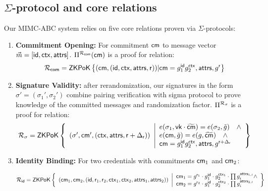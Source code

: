 \subsection{$\Sigma$-protocol and core relations}

Our MIMC-ABC system relies on five core relations proven via $\Sigma$-protocols:
\begin{enumerate}
    \item \textbf{Commitment Opening:} For commitment $\mathsf{cm}$ to message vector $\vec{m} = [\mathsf{id}, \mathsf{ctx}, \mathsf{attrs}]$. $\Pi^{\mathcal{R}_{\mathsf{com}}}(\mathsf{cm})$ is a proof for relation:
    \[
     {\mathcal{R}_{\mathsf{com}}} = {\mathsf{ZKPoK}} \left\{(\mathsf{cm}, (\mathsf{id}, \mathsf{ctx}, \mathsf{attrs}, \mathsf{r}))| \mathsf{cm} = g_1^{\mathsf{id}}g_2^{\mathsf{ctx}},\mathsf{attrs}, g^{\mathsf{r}} \right\}
    \]
    
    \item \textbf{Signature Validity:} after rerandomization, our signatures in the form $\sigma' = (\sigma_1', \sigma_2')$ combine pairing verification with sigma protocol to prove knowledge of the committed messages and randomization factor. $\Pi^{\mathcal{R}_{\sigma}}$ is a proof for relation:
         \[
    {\mathcal{R}_{\sigma}} = {\mathsf{ZKPoK}} \left\{ 
    \begin{array}{l} 
    (\sigma', \mathsf{cm}', (\mathsf{ctx}, \mathsf{attrs}, \mathsf{r} + \Delta_{\mathsf{r}})) \\
    \end{array} 
    \middle|
    \begin{array}{l}
    e(\sigma_1, \mathsf{vk} \cdot \widetilde{\mathsf{cm}}) = e(\sigma_2, \tilde{g}) \quad \wedge \\
    e(\mathsf{cm}, \tilde{g}) = e(g, \widetilde{\mathsf{cm}}) \quad \wedge\\
    \mathsf{cm} = g_1^{\mathsf{id}}g_2^{\mathsf{ctx}},\mathsf{attrs}, g^{\mathsf{r} + \Delta_{\mathsf{r}}} \\
    \end{array} 
    \right\}
    \]


    \item \textbf{Identity Binding:} For two credentials with commitments $\mathsf{cm}_1$ and $\mathsf{cm}_2$:

    \[
    {\mathcal{R}_{\mathsf{id}}} = {\mathsf{ZKPoK}} \left\{ 
    \begin{array}{l} 
    (\mathsf{cm}_1, \mathsf{cm}_2, (\mathsf{id}, \mathsf{r}_1, \mathsf{r}_2, \mathsf{ctx}_1, \mathsf{ctx}_2, \mathsf{attrs}_1, \mathsf{attrs}_2)) \\
    \end{array} 
    \middle|
    \begin{array}{l}
    \mathsf{cm}_1 = g^{\mathsf{r}_1} \cdot g_1^{\mathsf{id}} \cdot g_2^{\mathsf{ctx}_1} \cdot \prod g_i^{\mathsf{attrs}_{1,i}} \wedge \\
     \mathsf{cm}_2 = g^{\mathsf{r}_2} \cdot g_1^{\mathsf{id}} \cdot g_2^{\mathsf{ctx}_2} \cdot \prod g_i^{\mathsf{attrs}_{2,i}} \\
    \end{array} 
    \right\}
    \]
    

\end{enumerate}
